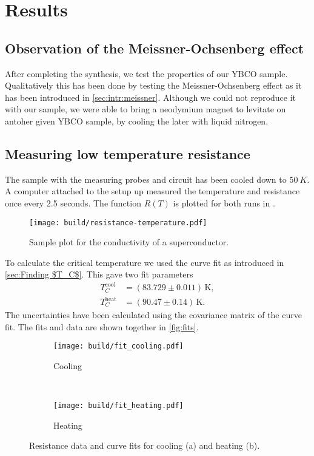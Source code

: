 \section{Results}
\label{sec:results}

\subsection{Observation of the Meissner-Ochsenberg effect}
\label{sec:Observation of the Meissner-Ochsenberg effect}
After completing the synthesis, we test the properties of our YBCO sample. Qualitatively this has
been done by testing the Meissner-Ochsenberg effect as it has been introduced in
\autoref{sec:intr:meissner}. Although we could not reproduce it with our sample, we were able to
bring a neodymium magnet to levitate on antoher given YBCO sample, by cooling the later with liquid
nitrogen.

\subsection{Measuring low temperature resistance}
\label{sec:Measuring low temperature resistance}
The sample with the measuring probes and circuit has been cooled down to $\SI{50}{K}$. A computer
attached to the setup up measured the temperature and resistance once every 2.5 seconds. The
function $R(T)$ is plotted for both runs in \label{fig:R-T}.
\begin{figure}
  \centering
  \texttt{[image: build/resistance-temperature.pdf]}
  \caption{Sample plot for the conductivity of a superconductor.}
  \label{fig:R-T}
\end{figure}
To calculate the critical temperature we used the curve fit as introduced in 
\autoref{sec:Finding $T_C$}. This gave two fit parameters
\begin{align}
  T_C^\text{cool} &= (83.729 \pm 0.011) \, \text{K}, \\
  T_C^\text{heat} &= (90.47 \pm 0.14) \, \text{K}.
\end{align}
The uncertainties have been calculated using the covariance matrix of the curve fit. The fits and
data are shown together in \autoref{fig:fits}.
\begin{figure}
     \centering
     \begin{subfigure}[b]{0.5\textwidth}
         \centering
         \texttt{[image: build/fit\_cooling.pdf]}
         \caption{Cooling}
         \label{fig:fit cooling}
     \end{subfigure}
     \\
     \begin{subfigure}[b]{0.5\textwidth}
         \centering
         \texttt{[image: build/fit\_heating.pdf]}
         \caption{Heating}
         \label{fig:fit heating}
     \end{subfigure}
     \caption{Resistance data and curve fits for cooling (a) and  heating (b).}
        \label{fig:fits}
\end{figure}

